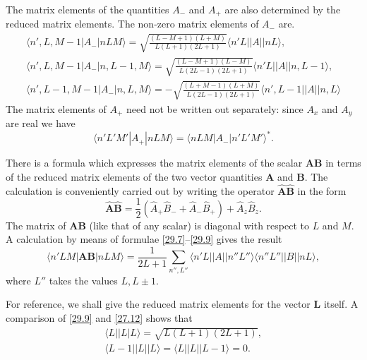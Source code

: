 The matrix elements of the quantities $ A_- $ and $ A_+ $ are also determined by the reduced matrix elements. The non-zero matrix elements of $ A_- $ are.
\begin{multline}\label{29.9}
\langle n',L,M-1|A_-|nLM\rangle=\sqrt{\frac{(L-M+1)(L+M)}{L(L+1)(2L+1)}}\langle n'L||A||nL\rangle,\\
\langle n',L,M-1|A_-|n,L-1,M\rangle=\sqrt{\frac{(L-M+1)(L-M)}{L(2L-1)(2L+1)}}\langle n'L||A||n,L-1\rangle,\\
\langle n',L-1,M-1|A_-|n,L,M\rangle=-\sqrt{\frac{(L+M-1)(L+M)}{L(2L-1)(2L+1)}}\langle n',L-1||A||n,L\rangle
\end{multline}
The matrix elements of $ A_+ $ need not be written out separately: since $ A_x $ and $ A_y $ are real we have
\begin{equation}\label{29.10}
\langle n'L'M'|A_+|nLM\rangle=\langle nLM|A_-|n'L'M'\rangle^*.
\end{equation}



There is a formula which expresses the matrix elements of the scalar $ \bm{A}\bm{B} $ in terms of the reduced matrix elements of the two vector quantities $ \bm{A} $ and $ \bm{B} $. The calculation is conveniently carried out by writing the operator $ \hat{\bm{A}}\hat{\bm{B}} $ in the form
\begin{equation}\label{29.11}
\hat{\bm{A}}\hat{\bm{B}}=\frac{1}{2}(\hat{A}_+\hat{B}_-+\hat{A}_-\hat{B}_+)+\hat{A}_z\hat{B}_z.
\end{equation}
The matrix of $ \bm{A}\bm{B} $ (like that of any scalar) is diagonal with respect to $ L $ and $ M $. A calculation by means of formulae \eqref{29.7}–\eqref{29.9} gives the result
\begin{equation}\label{29.12}
\langle n'LM|\bm{A}\bm{B}|nLM\rangle=\frac{1}{2L+1}\sum_{n'',L''}\langle n'L||A||n''L''\rangle\langle n''L''||B||nL\rangle,
\end{equation}
where $ L'' $ takes the values $ L, L\pm 1 $.

For reference, we shall give the reduced matrix elements for the vector $ \bm{L} $ itself. A comparison of \eqref{29.9} and \eqref{27.12} shows that
\begin{equation}\label{29.13}
\begin{split}
\langle L||L|L\rangle=\sqrt{L(L+1)(2L+1)},\\
\langle L-1||L||L\rangle=\langle L||L||L-1\rangle=0.
\end{split}
\end{equation}


